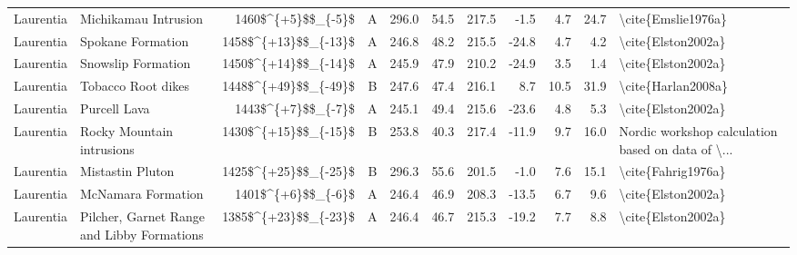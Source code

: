 \begin{longtable}{p{1 in}p{1 in}rrrrrrrr}
                     Laurentia &                             Michikamau Intrusion &     1460\$\textasciicircum \{+5\}\$\$\_\{-5\}\$ &      A &     296.0 &      54.5 & 217.5 &  -1.5 &       4.7 &        24.7 &                                 \textbackslash cite\{Emslie1976a\} \\
                     Laurentia &                                Spokane Formation &   1458\$\textasciicircum \{+13\}\$\$\_\{-13\}\$ &      A &     246.8 &      48.2 & 215.5 & -24.8 &       4.7 &         4.2 &                                 \textbackslash cite\{Elston2002a\} \\
                     Laurentia &                               Snowslip Formation &   1450\$\textasciicircum \{+14\}\$\$\_\{-14\}\$ &      A &     245.9 &      47.9 & 210.2 & -24.9 &       3.5 &         1.4 &                                 \textbackslash cite\{Elston2002a\} \\
                     Laurentia &                               Tobacco Root dikes &   1448\$\textasciicircum \{+49\}\$\$\_\{-49\}\$ &      B &     247.6 &      47.4 & 216.1 &   8.7 &      10.5 &        31.9 &                                 \textbackslash cite\{Harlan2008a\} \\
                     Laurentia &                                     Purcell Lava &     1443\$\textasciicircum \{+7\}\$\$\_\{-7\}\$ &      A &     245.1 &      49.4 & 215.6 & -23.6 &       4.8 &         5.3 &                                 \textbackslash cite\{Elston2002a\} \\
                     Laurentia &                        Rocky Mountain intrusions &   1430\$\textasciicircum \{+15\}\$\$\_\{-15\}\$ &      B &     253.8 &      40.3 & 217.4 & -11.9 &       9.7 &        16.0 &  Nordic workshop calculation based on data of \textbackslash ... \\
                     Laurentia &                                 Mistastin Pluton &   1425\$\textasciicircum \{+25\}\$\$\_\{-25\}\$ &      B &     296.3 &      55.6 & 201.5 &  -1.0 &       7.6 &        15.1 &                                 \textbackslash cite\{Fahrig1976a\} \\
                     Laurentia &                               McNamara Formation &     1401\$\textasciicircum \{+6\}\$\$\_\{-6\}\$ &      A &     246.4 &      46.9 & 208.3 & -13.5 &       6.7 &         9.6 &                                 \textbackslash cite\{Elston2002a\} \\
                     Laurentia &       Pilcher, Garnet Range and Libby Formations &   1385\$\textasciicircum \{+23\}\$\$\_\{-23\}\$ &      A &     246.4 &      46.7 & 215.3 & -19.2 &       7.7 &         8.8 &                                 \textbackslash cite\{Elston2002a\} \\

\end{longtable}
